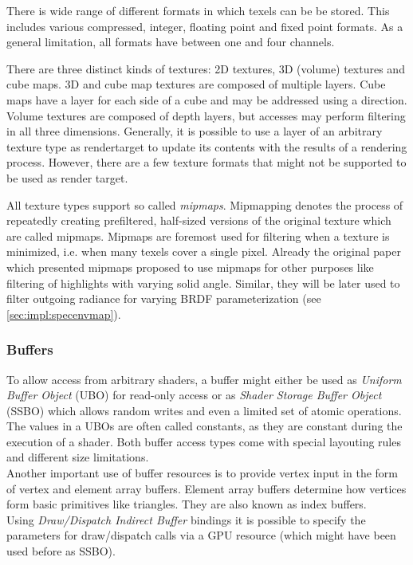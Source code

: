 \documentclass[thesis.tex]{subfiles}
\begin{document}
There is wide range of different formats in which texels can be be stored.
This includes various compressed, integer, floating point and fixed point formats.
As a general limitation, all formats have between one and four channels.

There are three distinct kinds of textures: 2D textures, 3D (volume) textures and cube maps.
3D and cube map textures are composed of multiple layers.
Cube maps have a layer for each side of a cube and may be addressed using a direction.
Volume textures are composed of depth layers, but accesses may perform filtering in all three dimensions.
Generally, it is possible to use a layer of an arbitrary texture type as rendertarget to update its contents with the results of a rendering process.
However, there are a few texture formats that might not be supported to be used as render target.

All texture types support so called \emph{mipmaps}.
Mipmapping denotes the process of repeatedly creating prefiltered, half-sized versions of the original texture which are called mipmaps.
Mipmaps are foremost used for filtering when a texture is minimized, i.e. when many texels cover a single pixel.
Already the original paper \cite{bib:mipmap} which presented mipmaps proposed to use mipmaps for other purposes like filtering of highlights with varying solid angle.
Similar, they will be later used to filter outgoing radiance for varying BRDF parameterization (see \autoref{sec:impl:specenvmap}).

\subsubsection{Buffers}
To allow access from arbitrary shaders, a buffer might either be used as \emph{Uniform Buffer Object} (UBO) for read-only access or as \emph{Shader Storage Buffer Object} (SSBO) which allows random writes and even a limited set of atomic operations.
The values in a UBOs are often called constants, as they are constant during the execution of a shader.
Both buffer access types come with special layouting rules and different size limitations.
\\
Another important use of buffer resources is to provide vertex input in the form of vertex and element array buffers.
Element array buffers determine how vertices form basic primitives like triangles. 
They are also known as index buffers.
\\
Using \emph{Draw/Dispatch Indirect Buffer} bindings it is possible to specify the parameters for draw/dispatch calls via a GPU resource (which might have been used before as SSBO).
\end{document}
